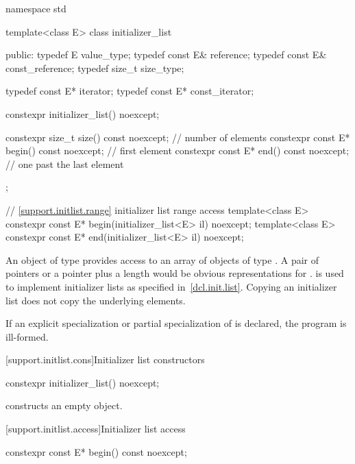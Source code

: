 \begin{codeblock}
namespace std {
  template<class E> class initializer_list {
  public:
    typedef E value_type;
    typedef const E& reference;
    typedef const E& const_reference;
    typedef size_t size_type;

    typedef const E* iterator;
    typedef const E* const_iterator;

    constexpr initializer_list() noexcept;

    constexpr size_t size() const noexcept;      // number of elements
    constexpr const E* begin() const noexcept;   // first element
    constexpr const E* end() const noexcept;     // one past the last element
  };

  // \ref{support.initlist.range} initializer list range access
  template<class E> constexpr const E* begin(initializer_list<E> il) noexcept;
  template<class E> constexpr const E* end(initializer_list<E> il) noexcept;
}
\end{codeblock}

\pnum
An object of type  provides access to an array of
objects of type . \enternote A pair of pointers or a pointer plus
a length would be obvious representations for .
 is used to implement initializer lists as specified
in~\ref{dcl.init.list}. Copying an initializer list does not copy the underlying
elements. \exitnote

\pnum
If an explicit specialization or partial specialization of
 is declared, the program is ill-formed.

[support.initlist.cons]{Initializer list constructors}

\begin{itemdecl}
constexpr initializer_list() noexcept;
\end{itemdecl}

\begin{itemdescr}
\pnum
\effects constructs an empty  object.

\pnum
\postcondition {}
\end{itemdescr}

[support.initlist.access]{Initializer list access}

\begin{itemdecl}
constexpr const E* begin() const noexcept;
\end{itemdecl}

